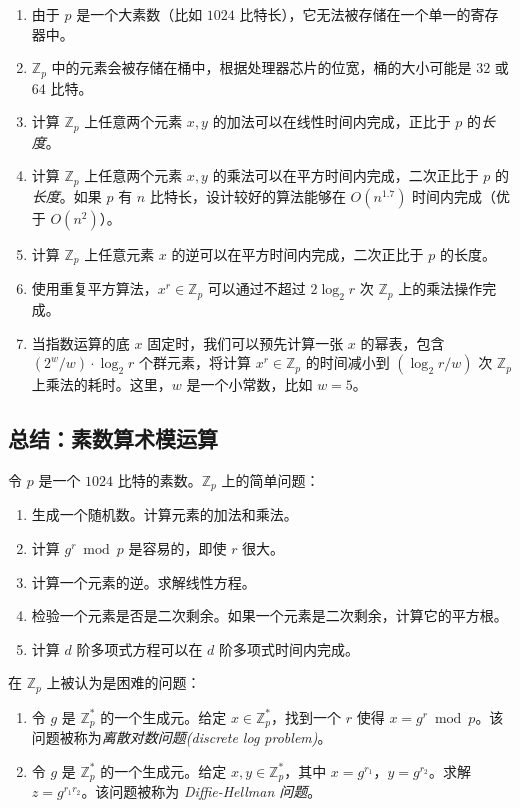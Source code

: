 \begin{enumerate}
	\item 由于 $p$ 是一个大素数（比如 $1024$ 比特长），它无法被存储在一个单一的寄存器中。
	\item $\mathbb{Z}_p$ 中的元素会被存储在桶中，根据处理器芯片的位宽，桶的大小可能是 $32$ 或 $64$ 比特。
	\item 计算 $\mathbb{Z}_p$ 上任意两个元素 $x,y$ 的加法可以在线性时间内完成，正比于 $p$ 的\emph{长度}。
	\item 计算 $\mathbb{Z}_p$ 上任意两个元素 $x,y$ 的乘法可以在平方时间内完成，二次正比于 $p$ 的\emph{长度}。如果 $p$ 有 $n$ 比特长，设计较好的算法能够在 $O(n^{1.7})$ 时间内完成（优于 $O(n^2)$）。
	\item 计算 $\mathbb{Z}_p$ 上任意元素 $x$ 的逆可以在平方时间内完成，二次正比于 $p$ 的长度。
	\item 使用重复平方算法，$x^r\in\mathbb{Z}_p$ 可以通过不超过 $2\log_2r$ 次 $\mathbb{Z}_p$ 上的乘法操作完成。
	\item 当指数运算的底 $x$ 固定时，我们可以预先计算一张 $x$ 的幂表，包含 $(2^w/w)\cdot\log_2r$ 个群元素，将计算 $x^r\in\mathbb{Z}_p$ 的时间减小到 $(\log_2r/w)$ 次 $\mathbb{Z}_p$ 上乘法的耗时。这里，$w$ 是一个小常数，比如 $w=5$。
\end{enumerate}

\subsection{总结：素数算术模运算}\label{subsec:A-2-5}

令 $p$ 是一个 $1024$ 比特的素数。$\mathbb{Z}_p$ 上的简单问题：
\begin{enumerate}
	\item 生成一个随机数。计算元素的加法和乘法。
	\item 计算 $g^r \bmod p$ 是容易的，即使 $r$ 很大。
	\item 计算一个元素的逆。求解线性方程。
	\item 检验一个元素是否是二次剩余。如果一个元素是二次剩余，计算它的平方根。
	\item 计算 $d$ 阶多项式方程可以在 $d$ 阶多项式时间内完成。
\end{enumerate}

在 $\mathbb{Z}_p$ 上被认为是困难的问题：
\begin{enumerate}
	\item 令 $g$ 是 $\mathbb{Z}_p^*$ 的一个生成元。给定 $x\in\mathbb{Z}_p^*$，找到一个 $r$ 使得 $x=g^r \bmod p$。该问题被称为\emph{离散对数问题(discrete log problem)}。
	\item 令 $g$ 是 $\mathbb{Z}_p^*$ 的一个生成元。给定 $x,y\in\mathbb{Z}_p^*$，其中 $x=g^{r_1}$，$y=g^{r_2}$。求解 $z=g^{r_1r_2}$。该问题被称为 \emph{Diffie-Hellman 问题}。
\end{enumerate}

